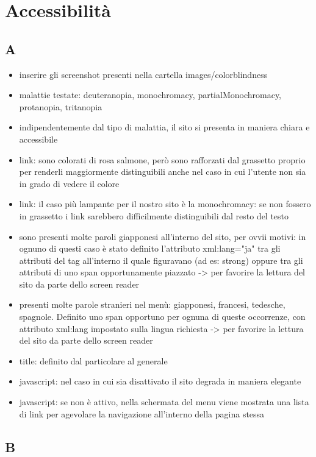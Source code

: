 \documentclass[../relazione.tex]{subfiles}
\begin{document}
\section{Accessibilità}
	\subsection{A}
	\begin{itemize}
		\item inserire gli screenshot presenti nella cartella images/colorblindness
		\item malattie testate: deuteranopia, monochromacy, partialMonochromacy, protanopia, tritanopia
		\item indipendentemente dal tipo di malattia, il sito si presenta in maniera chiara e accessibile
		\item link: sono colorati di rosa salmone, però sono rafforzati dal grassetto proprio per renderli maggiormente distinguibili anche nel caso in cui l'utente non sia in grado di vedere il colore
		\item link: il caso più lampante per il nostro sito è la monochromacy: se non fossero in grassetto i link sarebbero difficilmente distinguibili dal resto del testo
		\item sono presenti molte paroli giapponesi all'interno del sito, per ovvii motivi: in ognuno di questi caso è stato definito l'attributo xml:lang="ja" tra gli attributi del tag all'interno il quale figuravano (ad es: strong) oppure tra gli attributi di uno span opportunamente piazzato -> per favorire la lettura del sito da parte dello screen reader
		\item presenti molte parole stranieri nel menù: giapponesi, francesi, tedesche, spagnole. Definito uno span opportuno per ognuna di queste occorrenze, con attributo xml:lang impostato sulla lingua richiesta -> per favorire la lettura del sito da parte dello screen reader
		\item title: definito dal particolare al generale
		\item javascript: nel caso in cui sia disattivato il sito degrada in maniera elegante
		\item javascript: se non è attivo, nella schermata del menu viene mostrata una lista di link per agevolare la navigazione all'interno della pagina stessa
	\end{itemize}

	\subsection{B}
\end{document}
